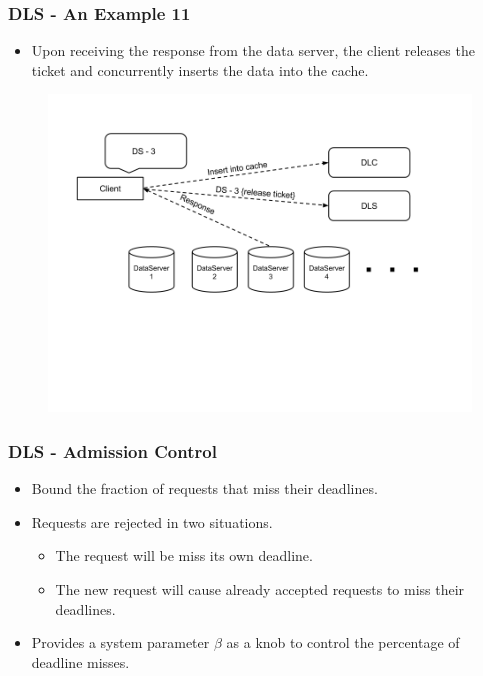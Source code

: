 \documentclass{beamer}
\begin{document}
\begin{frame}
  \frametitle{DLS - An Example 11}
  \begin{itemize}
  \item Upon receiving the response from the data server, the client releases
    the ticket and concurrently inserts the data into the cache.
  \end{itemize}
  \begin{figure}
    \begin{center}
      \centerline{\includegraphics[scale=0.35]{img/DLS_Example12.png}}
    \end{center}
  \end{figure}
\end{frame}


\begin{frame}
  \frametitle{DLS - Admission Control}
  \begin{itemize}
  \item Bound the fraction of requests that miss their deadlines.
  \item Requests are rejected in two situations.
    \begin{itemize}
    \item The request will be miss its own deadline.
    \item The new request will cause already accepted requests to miss their deadlines.
    \end{itemize}
  \item Provides a system parameter $\beta$ as a knob to control the percentage
    of deadline misses.
  \end{itemize}
\end{frame}
\end{document}

